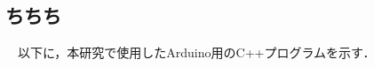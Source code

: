 \begin{center}
\section*{}                      %
\vspace*{-2zh}
\end{center}


\subsection{ちちち}
　以下に，本研究で使用したArduino用のC++プログラムを示す．
